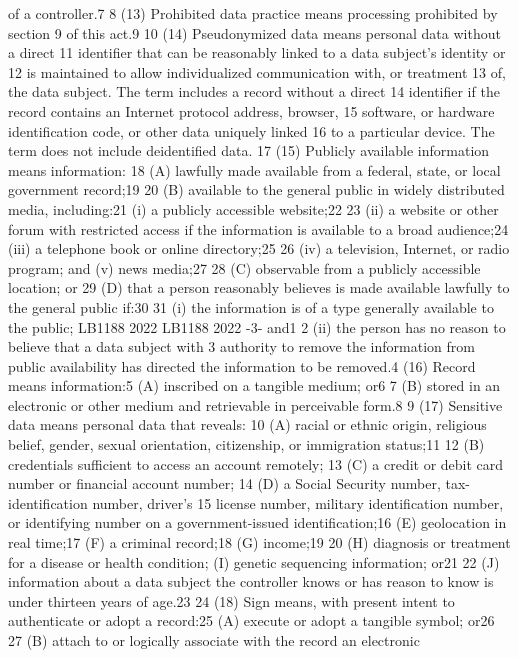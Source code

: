 of a controller.7
8 (13) Prohibited data practice means processing prohibited by section
9 of this act.9
10 (14) Pseudonymized data means personal data without a direct
11 identifier that can be reasonably linked to a data subject's identity or
12 is maintained to allow individualized communication with, or treatment
13 of, the data subject. The term includes a record without a direct
14 identifier if the record contains an Internet protocol address, browser,
15 software, or hardware identification code, or other data uniquely linked
16 to a particular device. The term does not include deidentified data.
17 (15) Publicly available information means information:
18 (A) lawfully made available from a federal, state, or local
government record;19
20 (B) available to the general public in widely distributed media,
including:21
(i) a publicly accessible website;22
23 (ii) a website or other forum with restricted access if the
information is available to a broad audience;24
(iii) a telephone book or online directory;25
26 (iv) a television, Internet, or radio program; and
(v) news media;27
28 (C) observable from a publicly accessible location; or
29 (D) that a person reasonably believes is made available lawfully to
the general public if:30
31 (i) the information is of a type generally available to the public;
LB1188
2022
LB1188
2022
-3-
and1
2 (ii) the person has no reason to believe that a data subject with
3 authority to remove the information from public availability has directed
the information to be removed.4
(16) Record means information:5
(A) inscribed on a tangible medium; or6
7 (B) stored in an electronic or other medium and retrievable in
perceivable form.8
9 (17) Sensitive data means personal data that reveals:
10 (A) racial or ethnic origin, religious belief, gender, sexual
orientation, citizenship, or immigration status;11
12 (B) credentials sufficient to access an account remotely;
13 (C) a credit or debit card number or financial account number;
14 (D) a Social Security number, tax-identification number, driver's
15 license number, military identification number, or identifying number on
a government-issued identification;16
(E) geolocation in real time;17
(F) a criminal record;18
(G) income;19
20 (H) diagnosis or treatment for a disease or health condition;
(I) genetic sequencing information; or21
22 (J) information about a data subject the controller knows or has
reason to know is under thirteen years of age.23
24 (18) Sign means, with present intent to authenticate or adopt a
record:25
(A) execute or adopt a tangible symbol; or26
27 (B) attach to or logically associate with the record an electronic
